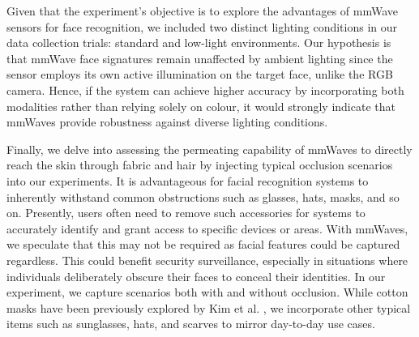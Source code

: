 \documentclass{mpaper}
\begin{document}
Given that the experiment's objective is to explore the advantages of mmWave sensors for face recognition, we included two distinct lighting conditions in our data collection trials: standard and low-light environments. Our hypothesis is that mmWave face signatures remain unaffected by ambient lighting since the sensor employs its own active illumination on the target face, unlike the RGB camera. Hence, if the system can achieve higher accuracy by incorporating both modalities rather than relying solely on colour, it would strongly indicate that mmWaves provide robustness against diverse lighting conditions.

Finally, we delve into assessing the permeating capability of mmWaves to directly reach the skin through fabric and hair by injecting typical occlusion scenarios into our experiments. It is advantageous for facial recognition systems to inherently withstand common obstructions such as glasses, hats, masks, and so on. Presently, users often need to remove such accessories for systems to accurately identify and grant access to specific devices or areas. With mmWaves, we speculate that this may not be required as facial features could be captured regardless. This could benefit security surveillance, especially in situations where individuals deliberately obscure their faces to conceal their identities. In our experiment, we capture scenarios both with and without occlusion. While cotton masks have been previously explored by Kim et al. \cite{kim2020face}, we incorporate other typical items such as sunglasses, hats, and scarves to mirror day-to-day use cases.
\end{document}
